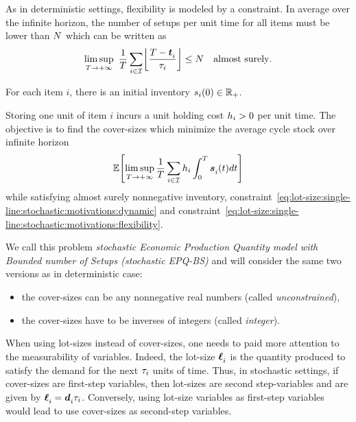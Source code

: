 As in deterministic settings, flexibility is modeled by a constraint.
In average over the infinite horizon, the number of setups per unit time for all items must be lower than $N$ which can be written as
\begin{equation}\label{eq:lot-size:single-line:stochastic:motivations:flexibility}
  \limsup_{\horizon\rightarrow+\infty}\ \frac{1}{\horizon} \sum_{i\in\REF} \left\lfloor\frac{\horizon-\va t_i}{\cover_i}\right\rfloor \le \nbsetups \quad \mbox{almost surely}.
\end{equation}

For each item $i$, there is an initial inventory $s_i\bracket{0}\in\RR_+$.


Storing one unit of item $i$ incurs a unit holding cost $h_i>0$ per unit time.
The objective is to find the cover-sizes which minimize the average cycle stock over infinite horizon
\begin{equation}
  \espe\sqbracket{
  \limsup_{\horizon\rightarrow+\infty}
  \frac{1}{\horizon} \sum_{i\in\REF} \holding_i \int_0^{\horizon}\va\inventory_i\bracket{t}dt
  }
\end{equation}
while satisfying almost surely nonnegative inventory, constraint~\eqref{eq:lot-size:single-line:stochastic:motivations:dynamic} and constraint~\eqref{eq:lot-size:single-line:stochastic:motivations:flexibility}.


We call this problem \emph{stochastic Economic Production Quantity model with Bounded number of Setups (stochastic EPQ-BS)} and will consider the same two versions as in deterministic case:
\begin{itemize}
  \item the cover-sizes can be any nonnegative real numbers (called \emph{unconstrained}),
  \item the cover-sizes have to be inverses of integers (called \emph{integer}).
\end{itemize}


\medskip


When using lot-sizes instead of cover-sizes, one needs to paid more attention to the measurability of variables.
Indeed, the lot-size $\va\lot_i$ is the quantity produced to satisfy the demand for the next $\tau_i$ units of time.
Thus, in stochastic settings, if cover-sizes are first-step variables, then lot-sizes are second step-variables and are given by $\va\lot_i=\va\demand_i\cover_i$.
Conversely, using lot-size variables as first-step variables would lead to use cover-sizes as second-step variables.



